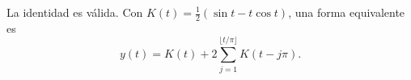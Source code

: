 La identidad es válida. Con $K(t)=\tfrac12(\sin t-t\cos t)$, una forma equivalente es
\[y(t)=K(t)+2\sum_{j=1}^{\lfloor t/\pi\rfloor}K(t-j\pi).\]
